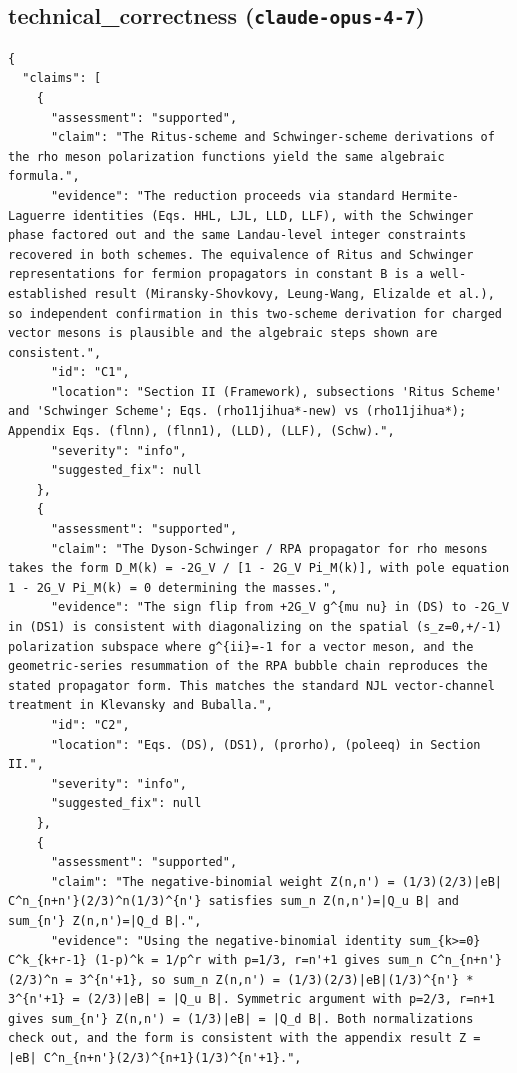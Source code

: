 \documentclass[11pt]{article}
\begin{document}
\subsection*{technical_correctness (\texttt{claude-opus-4-7})}
\begin{verbatim}
{
  "claims": [
    {
      "assessment": "supported",
      "claim": "The Ritus-scheme and Schwinger-scheme derivations of the rho meson polarization functions yield the same algebraic formula.",
      "evidence": "The reduction proceeds via standard Hermite-Laguerre identities (Eqs. HHL, LJL, LLD, LLF), with the Schwinger phase factored out and the same Landau-level integer constraints recovered in both schemes. The equivalence of Ritus and Schwinger representations for fermion propagators in constant B is a well-established result (Miransky-Shovkovy, Leung-Wang, Elizalde et al.), so independent confirmation in this two-scheme derivation for charged vector mesons is plausible and the algebraic steps shown are consistent.",
      "id": "C1",
      "location": "Section II (Framework), subsections 'Ritus Scheme' and 'Schwinger Scheme'; Eqs. (rho11jihua*-new) vs (rho11jihua*); Appendix Eqs. (flnn), (flnn1), (LLD), (LLF), (Schw).",
      "severity": "info",
      "suggested_fix": null
    },
    {
      "assessment": "supported",
      "claim": "The Dyson-Schwinger / RPA propagator for rho mesons takes the form D_M(k) = -2G_V / [1 - 2G_V Pi_M(k)], with pole equation 1 - 2G_V Pi_M(k) = 0 determining the masses.",
      "evidence": "The sign flip from +2G_V g^{mu nu} in (DS) to -2G_V in (DS1) is consistent with diagonalizing on the spatial (s_z=0,+/-1) polarization subspace where g^{ii}=-1 for a vector meson, and the geometric-series resummation of the RPA bubble chain reproduces the stated propagator form. This matches the standard NJL vector-channel treatment in Klevansky and Buballa.",
      "id": "C2",
      "location": "Eqs. (DS), (DS1), (prorho), (poleeq) in Section II.",
      "severity": "info",
      "suggested_fix": null
    },
    {
      "assessment": "supported",
      "claim": "The negative-binomial weight Z(n,n') = (1/3)(2/3)|eB| C^n_{n+n'}(2/3)^n(1/3)^{n'} satisfies sum_n Z(n,n')=|Q_u B| and sum_{n'} Z(n,n')=|Q_d B|.",
      "evidence": "Using the negative-binomial identity sum_{k>=0} C^k_{k+r-1} (1-p)^k = 1/p^r with p=1/3, r=n'+1 gives sum_n C^n_{n+n'}(2/3)^n = 3^{n'+1}, so sum_n Z(n,n') = (1/3)(2/3)|eB|(1/3)^{n'} * 3^{n'+1} = (2/3)|eB| = |Q_u B|. Symmetric argument with p=2/3, r=n+1 gives sum_{n'} Z(n,n') = (1/3)|eB| = |Q_d B|. Both normalizations check out, and the form is consistent with the appendix result Z = |eB| C^n_{n+n'}(2/3)^{n+1}(1/3)^{n'+1}.",

\end{verbatim}
\end{document}
